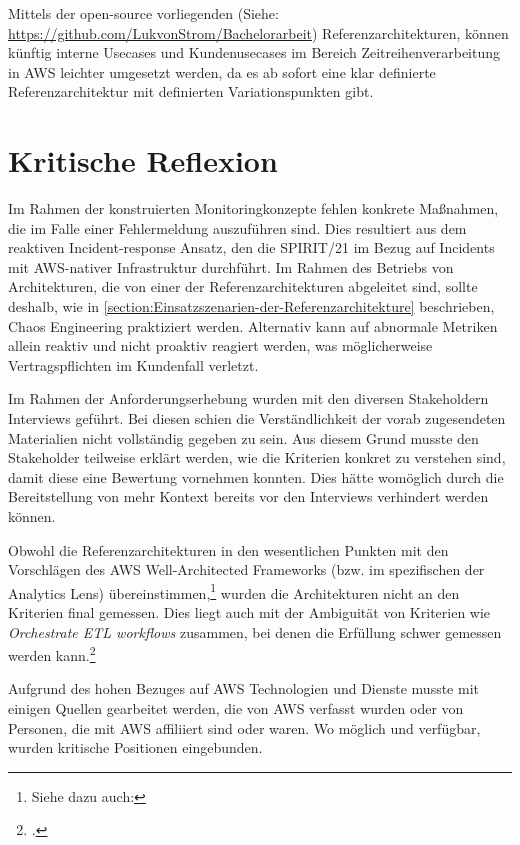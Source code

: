 Mittels der open-source vorliegenden (Siehe: \url{https://github.com/LukvonStrom/Bachelorarbeit}) Referenzarchitekturen, können künftig interne Usecases und Kundenusecases im Bereich Zeitreihenverarbeitung in \ac{AWS} leichter umgesetzt werden, da es ab sofort eine klar definierte Referenzarchitektur mit definierten Variationspunkten gibt. 


\section{Kritische Reflexion}\label{section:Kritische-Reflexion}

Im Rahmen der konstruierten Monitoringkonzepte fehlen konkrete Maßnahmen, die im Falle einer Fehlermeldung auszuführen sind. Dies resultiert aus dem reaktiven Incident-response Ansatz, den die SPIRIT/21 im Bezug auf Incidents mit \ac{AWS}-nativer Infrastruktur durchführt. Im Rahmen des Betriebs von Architekturen, die von einer der Referenzarchitekturen abgeleitet sind, sollte deshalb, wie in \autoref{section:Einsatzszenarien-der-Referenzarchitekture} beschrieben, Chaos Engineering praktiziert werden. Alternativ kann auf abnormale Metriken allein reaktiv und nicht proaktiv reagiert werden, was möglicherweise Vertragspflichten im Kundenfall verletzt.

Im Rahmen der Anforderungserhebung wurden mit den diversen Stakeholdern Interviews geführt. Bei diesen schien die Verständlichkeit der vorab zugesendeten Materialien nicht vollständig gegeben zu sein. Aus diesem Grund musste den Stakeholder teilweise erklärt werden, wie die Kriterien konkret zu verstehen sind, damit diese eine Bewertung vornehmen konnten. Dies hätte womöglich durch die Bereitstellung von mehr Kontext bereits vor den Interviews verhindert werden können.

Obwohl die Referenzarchitekturen in den wesentlichen Punkten mit den Vorschlägen des \ac{AWS} Well-Architected Frameworks (bzw. im spezifischen der Analytics Lens) übereinstimmen,\footnote{Siehe dazu auch: } wurden die Architekturen nicht an den Kriterien final gemessen. Dies liegt auch mit der Ambiguität von Kriterien wie \textit{Orchestrate ETL workflows} zusammen, bei denen die Erfüllung schwer gemessen werden kann.\footcite[Vgl.][6]{Ravirala.2020}

Aufgrund des hohen Bezuges auf \ac{AWS} Technologien und Dienste musste mit einigen Quellen gearbeitet werden, die von \ac{AWS} verfasst wurden oder von Personen, die mit \ac{AWS} affiliiert sind oder waren. Wo möglich und verfügbar, wurden kritische Positionen eingebunden.

